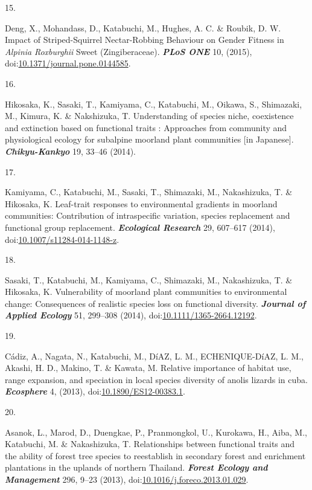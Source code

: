 \documentclass[
]{article}
\newlength{\cslhangindent}
\newlength{\csllabelwidth}
\newlength{\cslentryspacingunit} %
\newenvironment{CSLReferences}[2] %
 {%
  \setlength{\parindent}{0pt}
  \ifodd #1
  \let\oldpar\par
  \def\par{\hangindent=\cslhangindent\oldpar}
  \fi
  \setlength{\parskip}{#2\cslentryspacingunit}
 }%
 {}
\newcommand{\CSLLeftMargin}[1]{\parbox[t]{\csllabelwidth}{#1}}
\newcommand{\CSLRightInline}[1]{\parbox[t]{\linewidth - \csllabelwidth}{#1}\break}
\begin{document}
\begin{CSLReferences}{0}{0}
\leavevmode{}%
\CSLLeftMargin{15. }%
\CSLRightInline{Deng, X., Mohandass, D., Katabuchi, M., Hughes, A. C. \&
Roubik, D. W. Impact of {Striped-Squirrel Nectar-Robbing Behaviour} on
{Gender Fitness} in {\emph{Alpinia}}{ \emph{Roxburghii}} {Sweet}
({Zingiberaceae}). \textbf{\emph{PLoS ONE}} 10, (2015),
doi:\href{https://doi.org/10.1371/journal.pone.0144585}{10.1371/journal.pone.0144585}.}

\leavevmode{}%
\CSLLeftMargin{16. }%
\CSLRightInline{Hikosaka, K., Sasaki, T., Kamiyama, C., Katabuchi, M.,
Oikawa, S., Shimazaki, M., Kimura, K. \& Nakshizuka, T. Understanding of
species niche, coexistence and extinction based on functional traits :
{Approaches} from community and physiological ecology for subalpine
moorland plant communities {[}in {Japanese}{]}.
\textbf{\emph{Chikyu-Kankyo}} 19, 33--46 (2014).}

\leavevmode{}%
\CSLLeftMargin{17. }%
\CSLRightInline{Kamiyama, C., Katabuchi, M., Sasaki, T., Shimazaki, M.,
Nakashizuka, T. \& Hikosaka, K. Leaf-trait responses to environmental
gradients in moorland communities: Contribution of intraspecific
variation, species replacement and functional group replacement.
\textbf{\emph{Ecological Research}} 29, 607--617 (2014),
doi:\href{https://doi.org/10.1007/s11284-014-1148-z}{10.1007/s11284-014-1148-z}.}

\leavevmode{}%
\CSLLeftMargin{18. }%
\CSLRightInline{Sasaki, T., Katabuchi, M., Kamiyama, C., Shimazaki, M.,
Nakashizuka, T. \& Hikosaka, K. Vulnerability of moorland plant
communities to environmental change: {Consequences} of realistic species
loss on functional diversity. \textbf{\emph{Journal of Applied Ecology}}
51, 299--308 (2014),
doi:\href{https://doi.org/10.1111/1365-2664.12192}{10.1111/1365-2664.12192}.}

\leavevmode{}%
\CSLLeftMargin{19. }%
\CSLRightInline{Cádiz, A., Nagata, N., Katabuchi, M., DíAZ, L. M.,
ECHENIQUE-DíAZ, L. M., Akashi, H. D., Makino, T. \& Kawata, M. Relative
importance of habitat use, range expansion, and speciation in local
species diversity of anolis lizards in cuba. \textbf{\emph{Ecosphere}}
4, (2013),
doi:\href{https://doi.org/10.1890/ES12-00383.1}{10.1890/ES12-00383.1}.}

\leavevmode{}%
\CSLLeftMargin{20. }%
\CSLRightInline{Asanok, L., Marod, D., Duengkae, P., Pranmongkol, U.,
Kurokawa, H., Aiba, M., Katabuchi, M. \& Nakashizuka, T. Relationships
between functional traits and the ability of forest tree species to
reestablish in secondary forest and enrichment plantations in the
uplands of northern {Thailand}. \textbf{\emph{Forest Ecology and
Management}} 296, 9--23 (2013),
doi:\href{https://doi.org/10.1016/j.foreco.2013.01.029}{10.1016/j.foreco.2013.01.029}.}


\end{CSLReferences}
\end{document}
